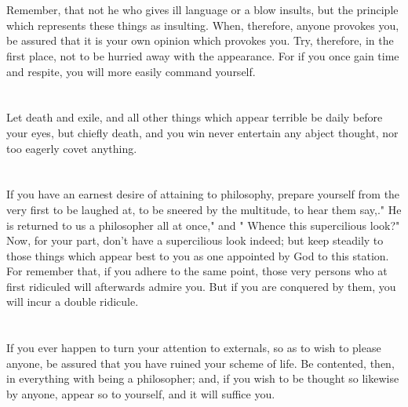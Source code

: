 \documentclass[12pt]{article}
\begin{document}
\section{}

Remember, that not he who gives ill language or a blow insults,
but the principle which represents these things as insulting. When,
therefore, anyone provokes you, be assured that it is your own opinion
which provokes you. Try, therefore, in the first place, not to be
hurried away with the appearance. For if you once gain time and respite,
you will more easily command yourself. 

\section{}

Let death and exile, and all other things which appear terrible
be daily before your eyes, but chiefly death, and you win never entertain
any abject thought, nor too eagerly covet anything. 

\section{}

If you have an earnest desire of attaining to philosophy, prepare
yourself from the very first to be laughed at, to be sneered by the
multitude, to hear them say,." He is returned to us a philosopher
all at once," and " Whence this supercilious look?" Now, for your
part, don't have a supercilious look indeed; but keep steadily to
those things which appear best to you as one appointed by God to this
station. For remember that, if you adhere to the same point, those
very persons who at first ridiculed will afterwards admire you. But
if you are conquered by them, you will incur a double ridicule.

\section{}

If you ever happen to turn your attention to externals, so as
to wish to please anyone, be assured that you have ruined your scheme
of life. Be contented, then, in everything with being a philosopher;
and, if you wish to be thought so likewise by anyone, appear so to
yourself, and it will suffice you. 

\section{}
\end{document}

